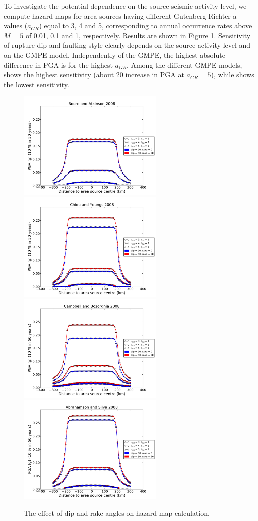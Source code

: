 To investigate the potential dependence on the source seismic activity level, we compute hazard maps for
area sources having different Gutenberg-Richter a values ($a_{GR}$) equal to 3, 4 and 5, corresponding to
annual occurrence rates above $M=5$ of 0.01, 0.1 and 1, respectively. Results are shown in Figure \ref{fig:dip_rake_area}. Sensitivity of rupture dip and faulting style clearly depends on the source activity level and on the GMPE model. Independently of the GMPE, the highest absolute difference in PGA is for the highest $a_{GR}$. Among the different GMPE models, \citet{campbell2008} shows the highest sensitivity (about 20 %
increase in PGA at $a_{GR}=5$), while \citet{boore2008} shows the lowest sensitivity.
\begin{figure}
\centering
\includegraphics[width=7cm]{./Pictures/PGA_0pt1_BA2008_dip_rake.pdf}
\includegraphics[width=7cm]{./Pictures/PGA_0pt1_CY2008_dip_rake.pdf}
\includegraphics[width=7cm]{./Pictures/PGA_0pt1_CB2008_dip_rake.pdf}
\includegraphics[width=7cm]{./Pictures/PGA_0pt1_AS2008_dip_rake.pdf}
\caption{The effect of dip and rake angles on hazard map calculation.}
\label{fig:dip_rake_area}
\end{figure}

